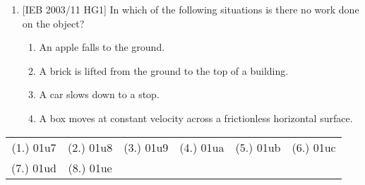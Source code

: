 \begin{eocexercises}{}
\begin{enumerate}
\item{[IEB 2003/11 HG1] In which of the following situations is there no work done on the object?

\begin{enumerate}
\item{An apple falls to the ground.}
\item{A brick is lifted from the ground to the top of a building.}
\item{A car slows down to a stop.}
\item{A box moves at constant velocity across a frictionless horizontal surface.}
\end{enumerate}
}

\end{enumerate}


\par \practiceinfo
\par \begin{tabular}[h]{cccccc}
(1.)	01u7	&
(2.)	01u8	&
(3.)	01u9	&
(4.)	01ua	&
(5.)	01ub	&
(6.)	01uc	\\ %
(7.)	01ud	&
(8.)	01ue	&
\end{tabular}

\end{eocexercises}





